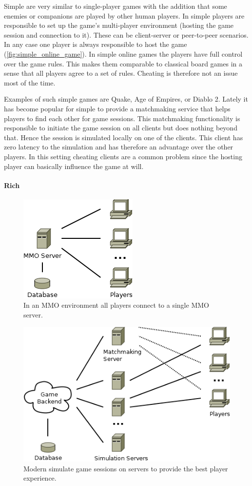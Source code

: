 Simple \ogs{} are very similar to single-player games with the addition that
some enemies or companions are played by other human players. In simple \ogs{}
players are responsible to set up the game's multi-player environment (hosting
the game session and connection to it). These can be client-server or
peer-to-peer scenarios. In any case one player is always responsible to host the
game (\autoref{fig:simple_online_game}). In simple online games the players have
full control over the game rules. This makes them comparable to classical board
games in a sense that all players agree to a set of rules. Cheating is therefore
not an issue most of the time.

Examples of such simple games are Quake, Age of Empires, or Diablo 2. Lately it
has become popular for simple \ogs{} to provide a matchmaking service that helps
players to find each other for game sessions. This matchmaking functionality is
responsible to initiate the game session on all clients but does nothing beyond
that. Hence the session is simulated locally on one of the clients. This client
has zero latency to the simulation and has therefore an advantage over the other
players. In this setting cheating clients are a common problem since the hosting
player can basically influence the game at will.

\paragraph{Rich \ogsucuc{}}

\begin{figure}
  \centering
  \includegraphics[width=.36\linewidth]{images/MMO}
  \caption{In an MMO environment all players connect to a single MMO server.}
  \label{fig:mmo}
\end{figure}
\begin{figure}
  \centering
  \includegraphics[width=.76\linewidth]{images/RichOnlineGame}
  \caption{Modern \og{} simulate game sessions on servers to provide the best
  player experience.}
  \label{fig:rich_online_game}
\end{figure}

